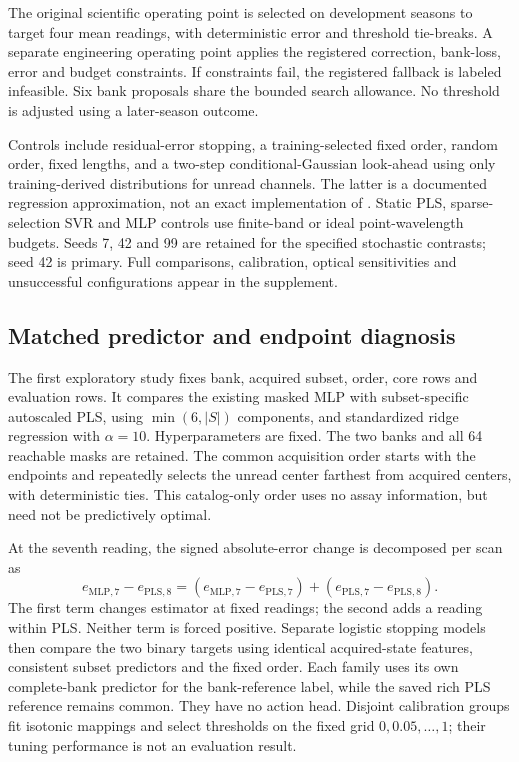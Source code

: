 \documentclass[11pt,a4paper]{article}
\begin{document}
The original scientific operating point is selected on development seasons to target four mean readings, with deterministic error and threshold tie-breaks. A separate engineering operating point applies the registered correction, bank-loss, error and budget constraints. If constraints fail, the registered fallback is labeled infeasible. Six bank proposals share the bounded search allowance. No threshold is adjusted using a later-season outcome.

Controls include residual-error stopping, a training-selected fixed order, random order, fixed lengths, and a two-step conditional-Gaussian look-ahead using only training-derived distributions for unread channels. The latter is a documented regression approximation, not an exact implementation of \citet{valancius2024}. Static PLS, sparse-selection SVR and MLP controls use finite-band or ideal point-wavelength budgets. Seeds 7, 42 and 99 are retained for the specified stochastic contrasts; seed 42 is primary. Full comparisons, calibration, optical sensitivities and unsuccessful configurations appear in the supplement.

\subsection{Matched predictor and endpoint diagnosis}
The first exploratory study fixes bank, acquired subset, order, core rows and evaluation rows. It compares the existing masked MLP with subset-specific autoscaled PLS, using $\min(6,|S|)$ components, and standardized ridge regression with $\alpha=10$. Hyperparameters are fixed. The two banks and all 64 reachable masks are retained. The common acquisition order starts with the endpoints and repeatedly selects the unread center farthest from acquired centers, with deterministic ties. This catalog-only order uses no assay information, but need not be predictively optimal.

At the seventh reading, the signed absolute-error change is decomposed per scan as
\begin{equation}
e_{\mathrm{MLP},7}-e_{\mathrm{PLS},8}
=\left(e_{\mathrm{MLP},7}-e_{\mathrm{PLS},7}\right)
+\left(e_{\mathrm{PLS},7}-e_{\mathrm{PLS},8}\right).
\end{equation}
The first term changes estimator at fixed readings; the second adds a reading within PLS. Neither term is forced positive. Separate logistic stopping models then compare the two binary targets using identical acquired-state features, consistent subset predictors and the fixed order. Each family uses its own complete-bank predictor for the bank-reference label, while the saved rich PLS reference remains common. They have no action head. Disjoint calibration groups fit isotonic mappings and select thresholds on the fixed grid $0,0.05,\ldots,1$; their tuning performance is not an evaluation result.
\end{document}
